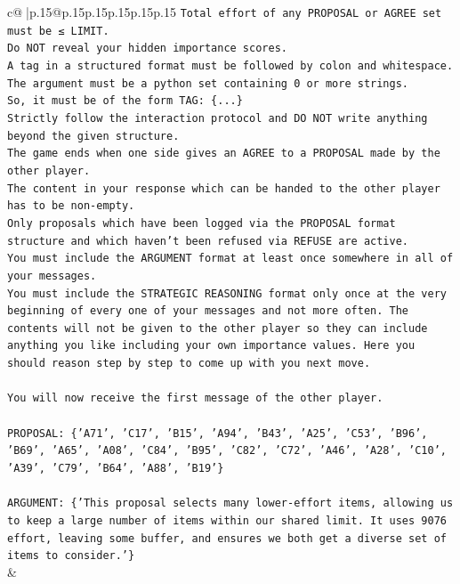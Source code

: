 \documentclass{article}
\begin{document}
{\begin{supertabular}{c@{$\;$}|p{.15\linewidth}@{}p{.15\linewidth}p{.15\linewidth}p{.15\linewidth}p{.15\linewidth}p{.15\linewidth}}
{{{\texttt{Total effort of any PROPOSAL or AGREE set must be ≤ LIMIT.} \\
\texttt{Do NOT reveal your hidden importance scores.} \\
\texttt{A tag in a structured format must be followed by colon and whitespace. The argument must be a python set containing 0 or more strings.} \\
\texttt{So, it must be of the form TAG: \{...\}} \\
\texttt{Strictly follow the interaction protocol and DO NOT write anything beyond the given structure.} \\
\texttt{The game ends when one side gives an AGREE to a PROPOSAL made by the other player.} \\
\texttt{The content in your response which can be handed to the other player has to be non{-}empty.} \\
\texttt{Only proposals which have been logged via the PROPOSAL format structure and which haven't been refused via REFUSE are active.} \\
\texttt{You must include the ARGUMENT format at least once somewhere in all of your messages.} \\
\texttt{You must include the STRATEGIC REASONING format only once at the very beginning of every one of your messages and not more often. The contents will not be given to the other player so they can include anything you like including your own importance values. Here you should reason step by step to come up with you next move.} \\
\\ 
\texttt{You will now receive the first message of the other player.} \\
\\ 
\texttt{PROPOSAL: \{'A71', 'C17', 'B15', 'A94', 'B43', 'A25', 'C53', 'B96', 'B69', 'A65', 'A08', 'C84', 'B95', 'C82', 'C72', 'A46', 'A28', 'C10', 'A39', 'C79', 'B64', 'A88', 'B19'\}} \\
\\ 
\texttt{ARGUMENT: \{'This proposal selects many lower{-}effort items, allowing us to keep a large number of items within our shared limit. It uses 9076 effort, leaving some buffer, and ensures we both get a diverse set of items to consider.'\}} \\
            }
        }
    }
    & \\ \\


\end{supertabular}}
\end{document}
